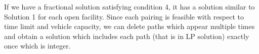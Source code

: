 
If we have a fractional solution satisfying condition 4, it has a solution similar
to Solution 1 for each open facility. Since each pairing is feasible with respect to
time limit and vehicle capacity, we can delete paths which appear multiple times and
obtain a solution which includes each path (that is in LP solution) exactly once
which is integer.  



     
